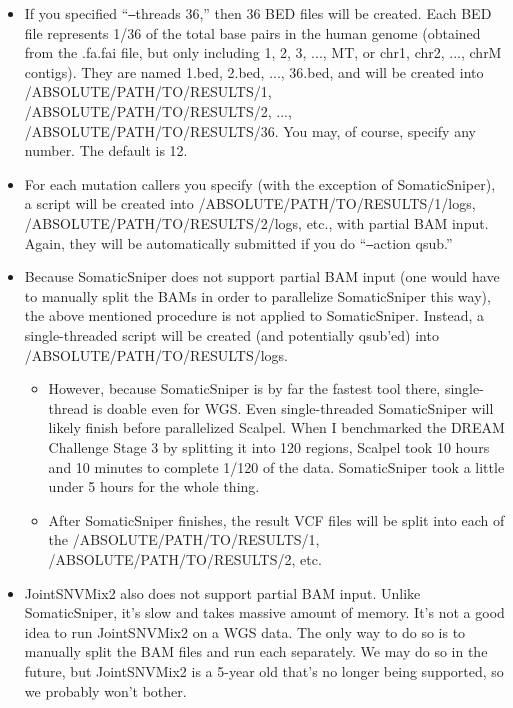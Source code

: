 \documentclass[10pt,letterpaper]{article}
\begin{document}
\begin{sloppypar}
\begin{itemize}
  \item
  If you specified ``\texttt{--}threads 36,'' then 36 BED files will be created. Each BED file represents 1/36 of the total base pairs in the human genome (obtained from the .fa.fai file, but only including 1, 2, 3, ..., MT, or chr1, chr2, ..., chrM contigs). They are named 1.bed, 2.bed, ..., 36.bed, and will be created into /ABSOLUTE/PATH/TO/RESULTS/1, /ABSOLUTE/PATH/TO/RESULTS/2, ..., /ABSOLUTE/PATH/TO/RESULTS/36. You may, of course, specify any number. The default is 12.

  \item
  For each mutation callers you specify (with the exception of SomaticSniper), a script will be created into /ABSOLUTE/PATH/TO/RESULTS/1/logs, /ABSOLUTE/PATH/TO/RESULTS/2/logs, etc., with partial BAM input. Again, they will be automatically submitted if you do ``\texttt{--}action qsub.''
  
  \item
  Because SomaticSniper does not support partial BAM input (one would have to manually split the BAMs in order to parallelize SomaticSniper this way), the above mentioned procedure is not applied to SomaticSniper. Instead, a single-threaded script will be created (and potentially qsub'ed) into /ABSOLUTE/PATH/TO/RESULTS/logs.

    \begin{itemize}
    \item However, because SomaticSniper is by far the fastest tool there, single-thread is doable even for WGS. Even single-threaded SomaticSniper will likely finish before parallelized Scalpel. When I benchmarked the DREAM Challenge Stage 3 by splitting it into 120 regions, Scalpel took 10 hours and 10 minutes to complete 1/120 of the data. SomaticSniper took a little under 5 hours for the whole thing.

    \item After SomaticSniper finishes, the result VCF files will be split into each of the /ABSOLUTE/PATH/TO/RESULTS/1, /ABSOLUTE/PATH/TO/RESULTS/2, etc.
    \end{itemize}


  \item
  JointSNVMix2 also does not support partial BAM input. Unlike SomaticSniper, it's slow and takes massive amount of memory. It's not a good idea to run JointSNVMix2 on a WGS data. The only way to do so is to manually split the BAM files and run each separately. We may do so in the future, but JointSNVMix2 is a 5-year old that's no longer being supported, so we probably won't bother.


\end{itemize}
\end{sloppypar}
\end{document}
